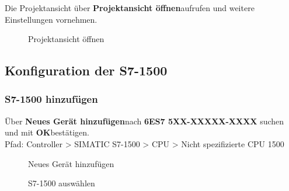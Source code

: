 Die Projektansicht über \glqq\textbf{Projektansicht öffnen}\grqq\:aufrufen und weitere Einstellungen vornehmen.
\begin{figure}[H]
   \centering
   \caption[Projektansicht öffnen]{Projektansicht öffnen}
   \label{fig:Bild6.6}
\end{figure}

\clearpage

\subsection{Konfiguration der S7-1500} \label{sec: Konfiguration_der_S7_1500}

\subsubsection{S7-1500 hinzufügen}
Über \glqq\textbf{Neues Gerät hinzufügen}\grqq\:nach \textbf{6ES7 5XX-XXXXX-XXXX} suchen und mit \glqq\textbf{OK}\grqq\:bestätigen.\\
Pfad: Controller > SIMATIC S7-1500 > CPU > Nicht spezifizierte CPU 1500
\begin{figure}[H]
    \centering
   \begin{minipage}[b]{.4\linewidth}
        \centering
        \caption[Neues Gerät hinzufügen]{Neues Gerät hinzufügen}
        \label{fig:Bild6.7}
   \end{minipage}
   \hspace{.1\linewidth}%
   \begin{minipage}[b]{.4\linewidth}
        \centering
        \caption[S7-1500 auswählen]{S7-1500 auswählen}
        \label{fig:Bild6.8}
   \end{minipage}
\end{figure}

